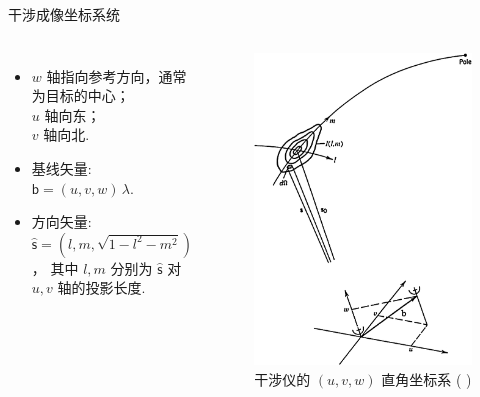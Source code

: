 \documentclass{beamer}
\newcommand{\B}[1]{\bm{\mathsf{#1}}}  %
\newcommand{\citeay}[1]{\citeauthor{#1} \citeyear{#1} \parencite{#1}}
\begin{document}
\begin{frame}{干涉成像坐标系统}
  \begin{columns}
    \begin{itemize}
      \item $w$ 轴指向参考方向，通常为目标的中心； \\
        $u$ 轴向东； \\
        $v$ 轴向北.
      \item 基线矢量: $\B{b} = (u,v,w) \,\lambda$.
      \item 方向矢量: $\hat{\B{s}} = \left( l, m, \sqrt{1-l^2-m^2} \right)$，
        其中 $l, m$ 分别为 $\hat{\B{s}}$ 对 $u, v$ 轴的投影长度.
    \end{itemize}

    \begin{figure}
      \centering
      \includegraphics[width=\columnwidth]{interferometer-coordsys}
      \caption{干涉仪的 $(u,v,w)$ 直角坐标系 (\citeay{thompson2017})}
    \end{figure}
  \end{columns}
\end{frame}
\end{document}
